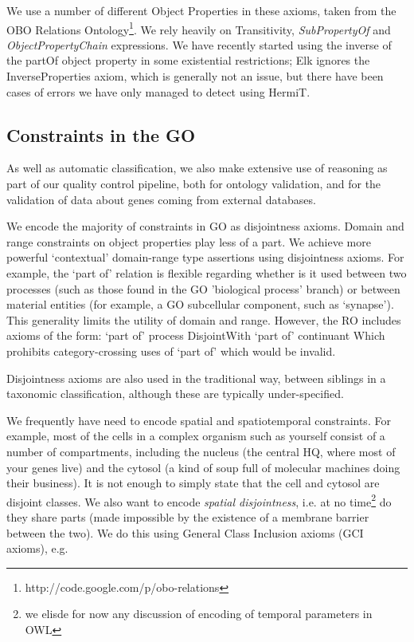\documentclass{llncs}
\begin{document}
We use a number of different Object Properties in these axioms, taken
from the OBO Relations
Ontology\footnote{http://code.google.com/p/obo-relations}. We rely
heavily on Transitivity, \emph{SubPropertyOf} and
\emph{ObjectPropertyChain} expressions. We have recently started using the
inverse of the partOf object property in some existential
restrictions\cite{berardini2010gene}; Elk ignores the
InverseProperties axiom, which is generally not an issue, but there
have been cases of errors we have only managed to detect using HermiT.

\subsection{Constraints in the GO}

As well as automatic classification, we also make extensive use of
reasoning as part of our quality control pipeline, both for ontology
validation, and for the validation of data about genes coming from
external databases.


We encode the majority of constraints in GO as disjointness axioms.
Domain and range constraints on object properties play less of a
part. We achieve more powerful ‘contextual’ domain-range type
assertions using disjointness axioms. For example, the `part of'
relation is flexible regarding whether is it used between two
processes (such as those found in the GO 'biological process' branch)
or between material entities (for example, a GO subcellular component,
such as ‘synapse’). This generality limits the utility of domain and
range. However, the RO includes axioms of the form: `part of' process
DisjointWith `part of' continuant Which prohibits category-crossing
uses of `part of' which would be invalid.

Disjointness axioms are also used in the traditional way, between
siblings in a taxonomic classification, although these are typically
under-specified.

We frequently have need to encode spatial and spatiotemporal
constraints. For example, most of the cells in a complex organism such
as yourself consist of a number of compartments, including the nucleus
(the central HQ, where most of your genes live) and the cytosol (a
kind of soup full of molecular machines doing their business). It is
not enough to simply state that the cell and cytosol are disjoint
classes. We also want to encode \emph{spatial disjointness}, i.e. at
no time\footnote{we elisde for now any discussion of encoding of
  temporal parameters in OWL} do they share parts (made impossible by
the existence of a membrane barrier between the two). We do this using
General Class Inclusion axioms (GCI axioms), e.g.
\end{document}

